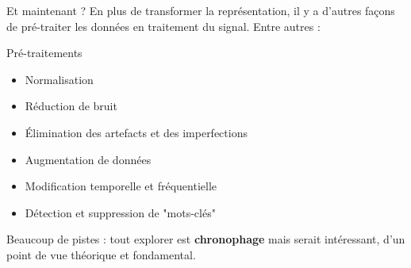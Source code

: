 \documentclass[compress,xcolor=table]{beamer}
\begin{document}
\begin{frame}{Et maintenant ?}
    En plus de transformer la représentation, il y a d'autres façons de pré-traiter les données en traitement du signal. Entre autres :

    \begin{block}{Pré-traitements}
        \begin{itemize}
            \item Normalisation
            \item Réduction de bruit
            \item Élimination des artefacts et des imperfections
            \item Augmentation de données
            \item Modification temporelle et fréquentielle
            \item Détection et suppression de "mots-clés"
        \end{itemize}
    \end{block}

    Beaucoup de pistes : tout explorer est \textbf{chronophage} mais serait intéressant, d'un point de vue théorique et fondamental.

\end{frame}



\end{document}
